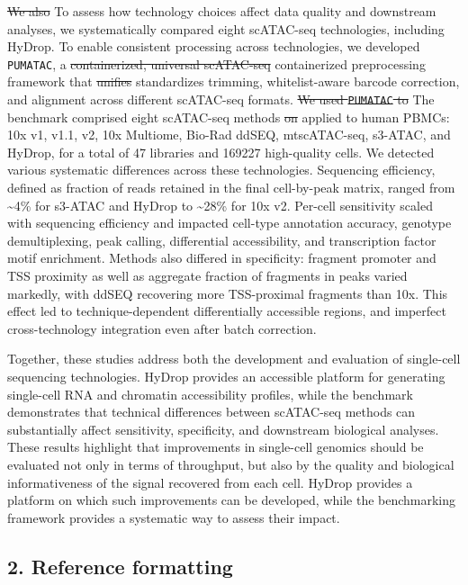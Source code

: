 \documentclass[11pt,a4paper]{article}
\newcommand{\deleted}[1]{{\color{removed}\sout{#1}}}
\newcommand{\inserted}[1]{{\color{added}#1}}
\begin{document}
\begin{reviewcomment}
\deleted{We also} \inserted{To assess how technology choices affect data quality and downstream analyses, we systematically compared eight scATAC-seq technologies, including HyDrop. To enable consistent processing across technologies, we} developed \texttt{PUMATAC}, a \deleted{containerized, universal scATAC-seq} \inserted{containerized} preprocessing framework that \deleted{unifies} \inserted{standardizes} trimming, whitelist-aware barcode correction, and alignment across different scATAC-seq formats. \deleted{We used \texttt{PUMATAC} to} \inserted{The} benchmark \inserted{comprised} eight scATAC-seq methods \deleted{on} \inserted{applied to} human PBMCs: 10x v1, v1.1, v2, 10x Multiome, Bio-Rad ddSEQ, mtscATAC-seq, s3-ATAC, and HyDrop, for a total of \num{47} libraries and \num{169227} high-quality cells. We detected various systematic differences across these technologies. Sequencing efficiency, defined as fraction of reads retained in the final cell-by-peak matrix, ranged from \textasciitilde\num{4}\% for s3-ATAC and HyDrop to \textasciitilde\num{28}\% for 10x v2. Per-cell sensitivity scaled with sequencing efficiency and impacted cell-type annotation accuracy, genotype demultiplexing, peak calling, differential accessibility, and transcription factor motif enrichment. Methods also differed in specificity: fragment promoter and TSS proximity as well as aggregate fraction of fragments in peaks varied markedly, with ddSEQ recovering more TSS-proximal fragments than 10x. This effect led to technique-dependent differentially accessible regions, and imperfect cross-technology integration even after batch correction.

\inserted{Together, these studies address both the development and evaluation of single-cell sequencing technologies. HyDrop provides an accessible platform for generating single-cell RNA and chromatin accessibility profiles, while the benchmark demonstrates that technical differences between scATAC-seq methods can substantially affect sensitivity, specificity, and downstream biological analyses. These results highlight that improvements in single-cell genomics should be evaluated not only in terms of throughput, but also by the quality and biological informativeness of the signal recovered from each cell. HyDrop provides a platform on which such improvements can be developed, while the benchmarking framework provides a systematic way to assess their impact.}
\end{reviewcomment}

\subsection*{\sffamily\color{heading}2. Reference formatting}
\end{document}
